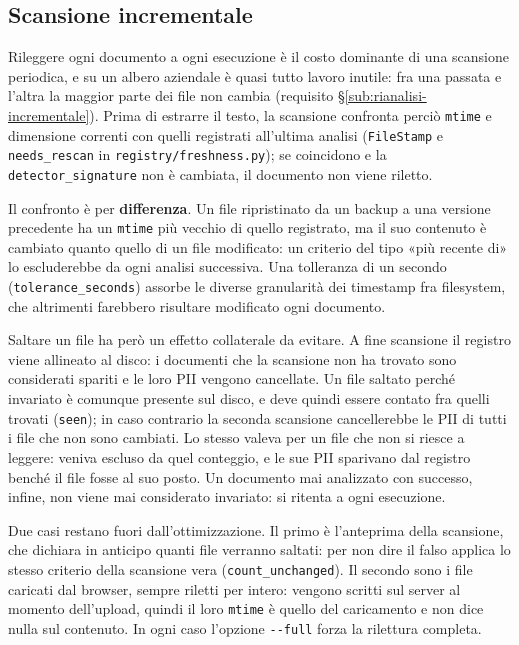\subsection{Scansione incrementale}
\label{sub:impl-b5-incrementale}

Rileggere ogni documento a ogni esecuzione è il costo dominante di una scansione periodica, e su un albero aziendale è quasi tutto lavoro inutile: fra una passata e l'altra la maggior parte dei file non cambia (requisito §\ref{sub:rianalisi-incrementale}). Prima di estrarre il testo, la scansione confronta perciò \texttt{mtime} e dimensione correnti con quelli registrati all'ultima analisi (\texttt{FileStamp} e \texttt{needs\_rescan} in \texttt{registry/freshness.py}); se coincidono e la \texttt{detector\_signature} non è cambiata, il documento non viene riletto.

Il confronto è per \textbf{differenza}. Un file ripristinato da un backup a una versione precedente ha un \texttt{mtime} più vecchio di quello registrato, ma il suo contenuto è cambiato quanto quello di un file modificato: un criterio del tipo «più recente di» lo escluderebbe da ogni analisi successiva. Una tolleranza di un secondo (\texttt{tolerance\_seconds}) assorbe le diverse granularità dei timestamp fra filesystem, che altrimenti farebbero risultare modificato ogni documento.

Saltare un file ha però un effetto collaterale da evitare. A fine scansione il registro viene allineato al disco: i documenti che la scansione non ha trovato sono considerati spariti e le loro PII vengono cancellate. Un file saltato perché invariato è comunque presente sul disco, e deve quindi essere contato fra quelli trovati (\texttt{seen}); in caso contrario la seconda scansione cancellerebbe le PII di tutti i file che non sono cambiati. Lo stesso valeva per un file che non si riesce a leggere: veniva escluso da quel conteggio, e le sue PII sparivano dal registro benché il file fosse al suo posto. Un documento mai analizzato con successo, infine, non viene mai considerato invariato: si ritenta a ogni esecuzione.

Due casi restano fuori dall'ottimizzazione. Il primo è l'anteprima della scansione, che dichiara in anticipo quanti file verranno saltati: per non dire il falso applica lo stesso criterio della scansione vera (\texttt{count\_unchanged}). Il secondo sono i file caricati dal browser, sempre riletti per intero: vengono scritti sul server al momento dell'upload, quindi il loro \texttt{mtime} è quello del caricamento e non dice nulla sul contenuto. In ogni caso l'opzione \texttt{-{}-full} forza la rilettura completa.

